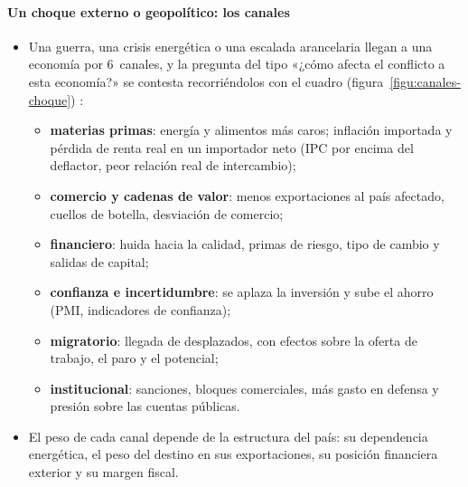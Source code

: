 \documentclass[11pt]{article}
\begin{document}
\paragraph{Un choque externo o geopolítico: los canales}
\begin{itemize}
\item Una guerra, una crisis energética o una escalada arancelaria llegan a una economía por 6~canales, y la pregunta del tipo «¿cómo afecta el conflicto a esta economía?» se contesta recorriéndolos con el cuadro (figura~\ref{figu:canales-choque}) \parencite{FMI2022WEOabr}:
  \begin{itemize}
  \item \textbf{materias primas}: energía y alimentos más caros; inflación importada y pérdida de renta real en un importador neto (IPC por encima del deflactor, peor relación real de intercambio);
  \item \textbf{comercio y cadenas de valor}: menos exportaciones al país afectado, cuellos de botella, desviación de comercio;
  \item \textbf{financiero}: huida hacia la calidad, primas de riesgo, tipo de cambio y salidas de capital;
  \item \textbf{confianza e incertidumbre}: se aplaza la inversión y sube el ahorro (PMI, indicadores de confianza);
  \item \textbf{migratorio}: llegada de desplazados, con efectos sobre la oferta de trabajo, el paro y el potencial;
  \item \textbf{institucional}: sanciones, bloques comerciales, más gasto en defensa y presión sobre las cuentas públicas.
  \end{itemize}
\item El peso de cada canal depende de la estructura del país: su dependencia energética, el peso del destino en sus exportaciones, su posición financiera exterior y su margen fiscal.
\end{itemize}

\begin{infografia}[H]
\centering
\caption{Los canales de un choque externo o geopolítico}\label{figu:canales-choque}
\end{infografia}
\end{document}
